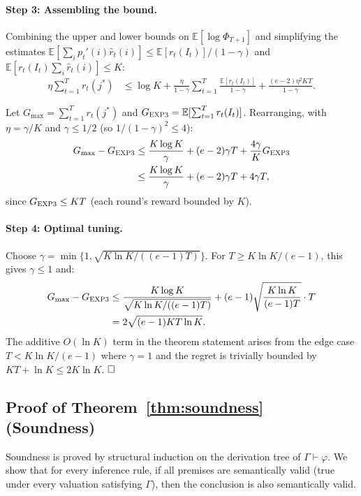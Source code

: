 \documentclass[acmtocl,review,anonymous]{acmart}
\newcommand{\proves}{\vdash}
\begin{document}
\paragraph{Step 3: Assembling the bound.}
Combining the upper and lower bounds on $\mathbb{E}[\log\Phi_{T+1}]$
and simplifying the estimates
$\mathbb{E}[\sum_i p_t'(i)\hat{r}_t(i)] \le \mathbb{E}[r_t(I_t)]/(1-\gamma)$
and
$\mathbb{E}[r_t(I_t)\sum_i \hat{r}_t(i)] \le K$:
\begin{align}
  \eta\sum_{t=1}^{T} r_t(j^*)
  &\le \log K
     + \frac{\eta}{1-\gamma} \sum_{t=1}^{T}
       \frac{\mathbb{E}[r_t(I_t)]}{1-\gamma}
     + \frac{(e-2)\eta^2 K T}{1-\gamma}.
\end{align}

Let $G_{\max} = \sum_{t=1}^{T} r_t(j^*)$ and
$G_{\textsc{EXP3}} = \mathbb{E}[\sum_{t=1}^{T} r_t(I_t)]$.
Rearranging, with $\eta = \gamma/K$ and $\gamma \le 1/2$ (so
$1/(1-\gamma)^2 \le 4$):
\begin{align}
  G_{\max} - G_{\textsc{EXP3}}
  &\le \frac{K\log K}{\gamma}
     + (e-2)\gamma T
     + \frac{4\gamma}{K} G_{\textsc{EXP3}} \nonumber \\
  &\le \frac{K\log K}{\gamma}
     + (e-2)\gamma T + 4\gamma T,
  \label{eq:exp3-bound-intermediate}
\end{align}
since $G_{\textsc{EXP3}} \le KT$ (each round's reward bounded by $K$).

\paragraph{Step 4: Optimal tuning.}
Choose $\gamma = \min\{1, \sqrt{K\ln K / ((e-1)T)}\}$.
For $T \ge K\ln K/(e-1)$, this gives $\gamma \le 1$ and:
\begin{align}
  G_{\max} - G_{\textsc{EXP3}}
  &\le \frac{K\log K}{\sqrt{K\ln K/((e-1)T)}}
     + (e-1)\sqrt{\frac{K\ln K}{(e-1)T}} \cdot T \nonumber \\
  &= 2\sqrt{(e-1)KT\ln K}.
\end{align}
The additive $O(\ln K)$ term in the theorem statement arises from
the edge case $T < K\ln K/(e-1)$ where $\gamma=1$ and the regret is
trivially bounded by $KT + \ln K \le 2K\ln K$.  $\hfill\square$

\subsection{Proof of Theorem~\ref{thm:soundness} (Soundness)}

Soundness is proved by structural induction on the derivation tree of
$\Gamma \proves \varphi$.  We show that for every inference rule, if all
premises are semantically valid (true under every valuation satisfying
$\Gamma$), then the conclusion is also semantically valid.
\end{document}
